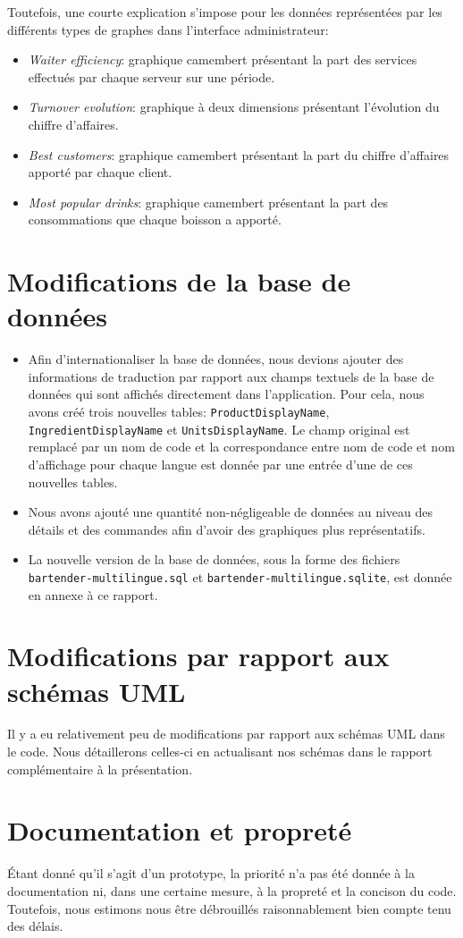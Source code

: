 \documentclass[a4paper,10pt]{article}
\begin{document}
Toutefois, une courte explication s'impose pour les données représentées par les différents types de graphes dans l'interface administrateur:
\begin{itemize}
    \item \emph{Waiter efficiency}: graphique camembert présentant la part des services effectués par chaque serveur sur une période.
    \item \emph{Turnover evolution}: graphique à deux dimensions présentant l'évolution du chiffre d'affaires.
    \item \emph{Best customers}: graphique camembert présentant la part du chiffre d'affaires apporté par chaque client.
    \item \emph{Most popular drinks}: graphique camembert présentant la part des consommations que chaque boisson a apporté.
\end{itemize}

\section{Modifications de la base de données}

\begin{itemize}
    \item Afin d'internationaliser la base de données, nous devions ajouter des informations de traduction par rapport aux champs textuels de la base de données qui sont affichés directement dans l'application. Pour cela, nous avons créé trois nouvelles tables: \texttt{ProductDisplayName}, \texttt{IngredientDisplayName} et \texttt{UnitsDisplayName}. Le champ original est remplacé par un nom de code et la correspondance entre nom de code et nom d'affichage pour chaque langue est donnée par une entrée d'une de ces nouvelles tables.
    \item Nous avons ajouté une quantité non-négligeable de données au niveau des détails et des commandes afin d'avoir des graphiques plus représentatifs.
    \item La nouvelle version de la base de données, sous la forme des fichiers \texttt{bartender-multilingue.sql} et \texttt{bartender-multilingue.sqlite}, est donnée en annexe à ce rapport.
\end{itemize}

\section{Modifications par rapport aux schémas UML}

Il y a eu relativement peu de modifications par rapport aux schémas UML dans le code. Nous détaillerons celles-ci en actualisant nos schémas dans le rapport complémentaire à la présentation.

\section{Documentation et propreté}

Étant donné qu'il s'agit d'un prototype, la priorité n'a pas été donnée à la documentation ni, dans une certaine mesure, à la propreté et la concison du code. Toutefois, nous estimons nous être débrouillés raisonnablement bien compte tenu des délais.
\end{document}
